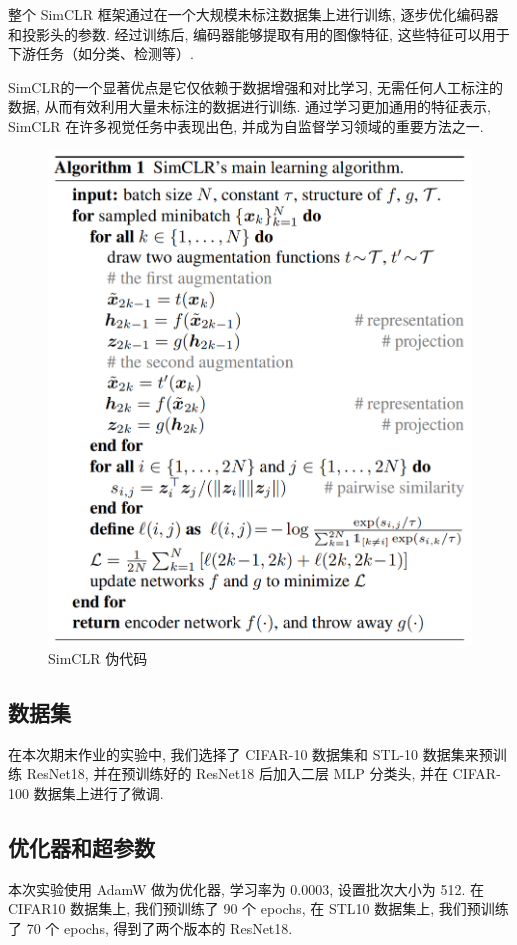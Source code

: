 \documentclass[notitlepage,cs4size,punct,oneside]{ctexrep}
\numberwithin{equation}{chapter}
\theoremstyle{mystyle}
\begin{document}
整个 SimCLR 框架通过在一个大规模未标注数据集上进行训练, 逐步优化编码器和投影头的参数. 经过训练后, 编码器能够提取有用的图像特征, 这些特征可以用于下游任务（如分类、检测等）.

SimCLR的一个显著优点是它仅依赖于数据增强和对比学习, 无需任何人工标注的数据, 从而有效利用大量未标注的数据进行训练. 通过学习更加通用的特征表示, SimCLR 在许多视觉任务中表现出色, 并成为自监督学习领域的重要方法之一.
\begin{figure}[H]
    \centering
    \includegraphics[scale=0.6]{simclr_code.png}
    \caption{SimCLR 伪代码}
\end{figure}

\subsection{数据集}
在本次期末作业的实验中, 我们选择了 CIFAR-10 数据集和 STL-10 数据集来预训练 ResNet18, 并在预训练好的 ResNet18 后加入二层 MLP 分类头, 并在 CIFAR-100 数据集上进行了微调.

\subsection{优化器和超参数}
本次实验使用 AdamW 做为优化器, 学习率为 $0.0003$, 设置批次大小为 512. 在 CIFAR10 数据集上, 我们预训练了 90 个 epochs, 在 STL10 数据集上, 我们预训练了 70 个 epochs, 得到了两个版本的 ResNet18.
\end{document}
